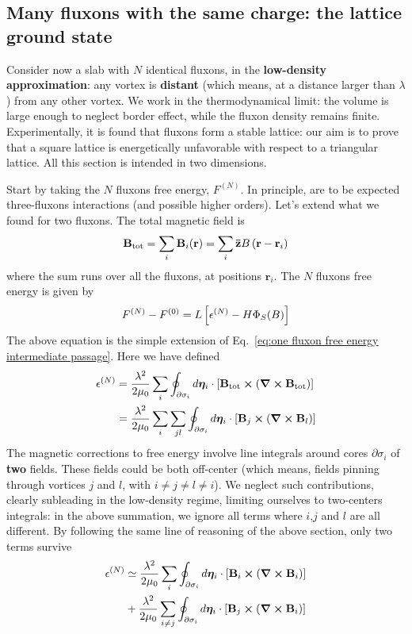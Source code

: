\subsection{Many fluxons with the same charge: the lattice ground state}

Consider now a slab with $N$ identical fluxons, in the \textbf{low-density approximation}: any vortex is \textbf{distant} (which means, at a distance larger than $\lambda$) from any other vortex. We work in the thermodynamical limit: the volume is large enough to neglect border effect, while the fluxon density remains finite. Experimentally, it is found that fluxons form a stable lattice: our aim is to prove that a square lattice is energetically unfavorable with respect to a triangular lattice. All this section is intended in two dimensions.

Start by taking the $N$ fluxons free energy, $F^{(N)}$. In principle, are to be expected three-fluxons interactions (and possible higher orders).
Let's extend what we found for two fluxons. The total magnetic field is
\[
	\mathbf{B}_\mathrm{tot} = \sum_i \mathbf{B}_i (\mathbf r) = \sum_i \mathbf{\bar{z}} B\left({\mathbf{r} - \mathbf{r}_i}\right)
\]
where the sum runs over all the fluxons, at positions $\mathbf{r}_i$. The $N$ fluxons free energy is given by
\[
	F^{(N)} - F^{(0)} = L \left[{\epsilon^{(N)} - H \Phi_{S} (B)}\right]
\]
The above equation is the simple extension of Eq.~\eqref{eq:one fluxon free energy intermediate passage}. Here we have defined
\[
\begin{aligned}
	\epsilon^{(N)} &= \frac{\lambda^2}{2\mu_0} \sum_i \oint_{\partial\sigma_i} d\bm\eta_i \cdot \left[{ \mathbf{B}_\mathrm{tot} \bm{\times} \left({\curl\mathbf{B}_\mathrm{tot}}\right) }\right] \\
	&= \frac{\lambda^2}{2\mu_0} \sum_i \sum_{jl} \oint_{\partial\sigma_i} d\bm\eta_i \cdot \left[{ \mathbf{B}_j \bm{\times} \left({\curl\mathbf{B}_l}\right) }\right]
\end{aligned}
\]
The magnetic corrections to free energy involve line integrals around cores $\partial\sigma_i$ of \textbf{two} fields. These fields could be both off-center (which means, fields pinning through vortices $j$ and $l$, with $i\neq j\neq l\neq i$). We neglect such contributions, clearly subleading in the low-density regime, limiting ourselves to two-centers integrals: in the above summation, we ignore all terms where $i$,$j$ and $l$ are all different. By following the same line of reasoning of the above section, only two terms survive
\[
\begin{aligned}
	\epsilon^{(N)} &\simeq \frac{\lambda^2}{2\mu_0} \sum_i \oint_{\partial\sigma_i} d\bm\eta_i \cdot \left[{ \mathbf{B}_i \bm{\times} \left({\curl\mathbf{B}_i }\right) }\right] \\
	&+ \frac{\lambda^2}{2\mu_0} \sum_{i\neq j} \oint_{\partial\sigma_i} d\bm\eta_i \cdot \left[{ \mathbf{B}_j \bm{\times} \left({\curl\mathbf{B}_i }\right) }\right]
\end{aligned}
\]
